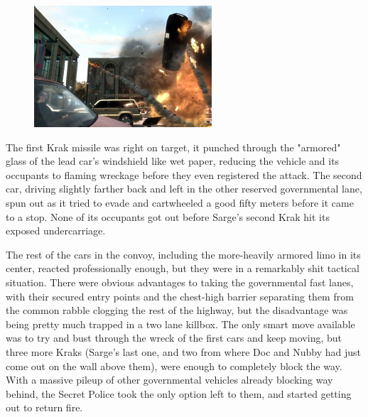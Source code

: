 \begin{figure}
	\begin{center}
		\includegraphics[width=\figwidth]{pics/19/40.png}
	\end{center}
\end{figure}
The first Krak missile was right on target, it punched through the "armored" glass of the lead car's windshield like wet paper, reducing the vehicle and its occupants to flaming wreckage before they even registered the attack. 
The second car, driving slightly farther back and left in the other reserved governmental lane, spun out as it tried to evade and cartwheeled a good fifty meters before it came to a stop. 
None of its occupants got out before Sarge's second Krak hit its exposed undercarriage.

The rest of the cars in the convoy, including the more-heavily armored limo in its center, reacted professionally enough, but they were in a remarkably shit tactical situation. 
There were obvious advantages to taking the governmental fast lanes, with their secured entry points and the chest-high barrier separating them from the common rabble clogging the rest of the highway, but the disadvantage was being pretty much trapped in a two lane killbox. 
The only smart move available was to try and bust through the wreck of the first cars and keep moving, but three more Kraks (Sarge's last one, and two from where Doc and Nubby had just come out on the wall above them), were enough to completely block the way. 
With a massive pileup of other governmental vehicles already blocking way behind, the Secret Police took the only option left to them, and started getting out to return fire.

